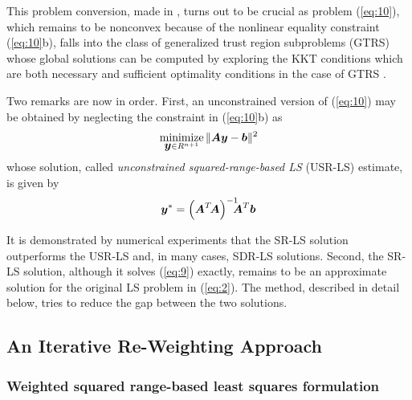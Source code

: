 This problem conversion, made in \cite{BeckStLi}, turns out to be crucial as problem (\ref{eq:10}), which remains to be nonconvex because of the nonlinear equality constraint (\ref{eq:10}b), falls into the class of generalized trust region subproblems (GTRS) \cite{More, FortinWol}  whose global solutions can be computed by exploring the KKT conditions which are both necessary and sufficient optimality conditions in the case of GTRS \cite{More}.

Two remarks are now in order. First, an unconstrained version of (\ref{eq:10}) may be obtained by neglecting the constraint in (\ref{eq:10}b) as
\begin{equation} \label{eq:13}%
\Min_{{\By} \in R^{n+1}} \|\BA\By-\Bb\|^2
\end{equation}
whose solution, called \textit{unconstrained squared-range-based LS }(USR-LS) estimate, is given by
\begin{equation} \label{eq:14}%
\By^*=\left(\BA^T\!\BA\right)^{-1}\!\!\!\!\BA^T\Bb
\end{equation}

It is demonstrated by numerical experiments \cite{BeckStLi} that the SR-LS solution outperforms the USR-LS and, in many cases, SDR-LS solutions. Second, the SR-LS solution, although it solves (\ref{eq:9}) exactly, remains to be an approximate solution for the original LS problem in (\ref{eq:2}). The method, described in detail below, tries to reduce the gap between the two solutions.

\subsection{An Iterative Re-Weighting Approach}%
\subsubsection{Weighted squared range-based least squares formulation} %

